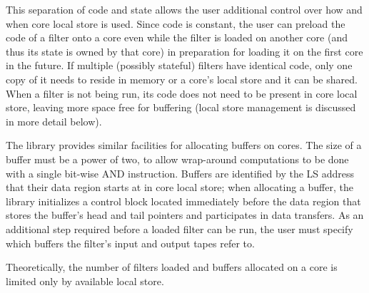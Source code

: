 This separation of code and state allows the user additional control
over how and when core local store is used. Since code is constant,
the user can preload the code of a filter onto a core even while the
filter is loaded on another core (and thus its state is owned by that
core) in preparation for loading it on the first core in the
future. If multiple (possibly stateful) filters have identical code,
only one copy of it needs to reside in memory or a core's local store
and it can be shared. When a filter is not being run, its code does
not need to be present in core local store, leaving more space free
for buffering (local store management is discussed in more detail
below).

The library provides similar facilities for allocating buffers on
cores. The size of a buffer must be a power of two, to allow
wrap-around computations to be done with a single bit-wise \textsf{AND}
instruction. Buffers are identified by the LS address that their data
region starts at in core local store; when allocating a buffer, the
library initializes a control block located immediately before the
data region that stores the buffer's head and tail pointers and
participates in data transfers. As an additional step required before
a loaded filter can be run, the user must specify which buffers the
filter's input and output tapes refer to.


Theoretically, the number of filters loaded and buffers allocated on a
core is limited only by available local store.

